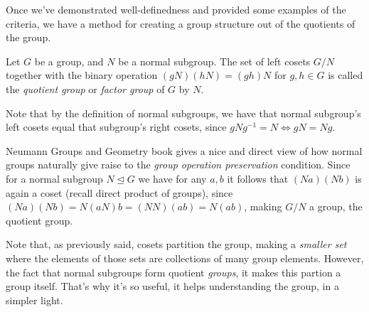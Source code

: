 Once we've demonstrated well-definedness and provided some examples of the criteria, we
have a method for creating a group structure out of the quotients of the group. 

\begin{definition}
  Let $G$ be a group, and $N$ be a normal subgroup. The set of left cosets $G/N$ together
  with the binary operation $(gN)(hN)=(gh)N$ for $g,h\in G$ is called the \emph{quotient
  group} or \emph{factor group} of $G$ by $N$.
  \label{quotientGroup}
\end{definition}
Note that by the definition of normal subgroups, we have that normal subgroup's left
cosets equal that subgroup's right cosets, since $gNg^{-1}=N\iff gN=Ng$.
\begin{remark}
  Neumann Groups and Geometry book gives a nice and direct view of how normal groups
  naturally give raise to the \emph{group operation preservation} condition. Since for a
  normal subgroup $N\trianglelefteq G$ we have for any $a,b$ it follows that $(Na)(Nb)$ is
  again a coset (recall direct product of groups), since $(Na)(Nb)=N(aN)b=(NN)(ab)=N(ab)$,
  making $G/N$ a group, the quotient group.
\end{remark}

\begin{remark}
  Note that, as previously said, cosets partition the group, making a \emph{smaller set}
  where the elements of those sets are collections of many group elements. However, the
  fact that normal subgroups form quotient \emph{groups}, it makes this partion a group
  itself. That's why it's so useful, it helps understanding the group, in a simpler light.
\end{remark}
